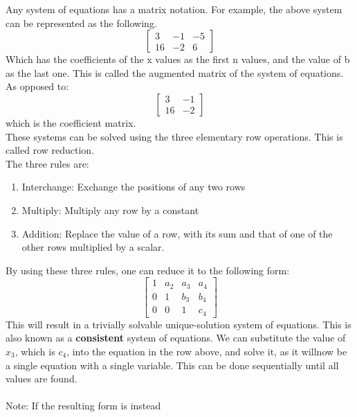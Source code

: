 \documentclass[nobib]{tufte-handout}
\begin{document}
Any system of equations has a matrix notation. For example, the above system can be represented as the following.\\
\begin{equation*}
    \begin{bmatrix}
        3  & -1 & -5 \\
        16 & -2 & 6
    \end{bmatrix}
\end{equation*}
Which has the coefficients of the x values as the first n values, and the value of b as the last one. This is called the augmented matrix of the system of equations. As opposed to:
\begin{equation*}
    \begin{bmatrix}
        3  & -1 \\
        16 & -2
    \end{bmatrix}
\end{equation*}
which is the coefficient matrix.\\
These systems can be solved using the three elementary row operations. This is called row reduction.\\
The three rules are:
\begin{enumerate}
    \item Interchange: Exchange the positions of any two rows
    \item Multiply: Multiply any row by a constant
    \item Addition: Replace the value of a row, with its sum and that of one of the other
          rows multiplied by a scalar.
\end{enumerate}
By using these three rules, one can reduce it to the following form:
\begin{equation*}
    \begin{bmatrix}
        1 & a_2 & a_3 & a_4 \\
        0 & 1   & b_3 & b_4 \\
        0 & 0   & 1   & c_4
    \end{bmatrix}
\end{equation*}
This will result in a trivially solvable unique-solution system of equations. This is also known as a \textbf{consistent} system of equations. We can substitute the value of $x_3$, which is $c_4$, into the equation in the row above, and solve it, as it willnow be a single equation with a single variable. This can be done sequentially until all values are found.\\~\\
Note: If the resulting form is instead
\end{document}
